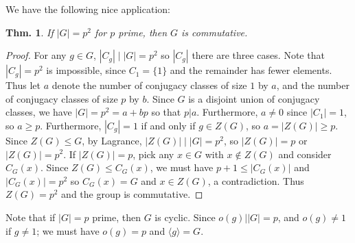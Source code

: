 \documentclass[12pt, a4paper]{book}
\newtheorem{theorem}{Thm.}[section]
\theoremstyle{nonumberplain}
\newtheorem{proof}{Proof}
\begin{document}
We have the following nice application:
\begin{theorem}
    If $|G|=p^2$ for $p$ prime, then $G$ is commutative.
\end{theorem}
\begin{proof}
    For any $g\in G$, $|C_g|\mid|G|=p^2$ so $|C_g|$ there are three cases.
    Note that $|C_g|=p^2$ is impossible, since $C_1=\{1\}$ and the remainder has fewer elements.
    Thus let $a$ denote the number of conjugacy classes of size $1$ by $a$, and the number of conjugacy classes of size $p$ by $b$.
    Since $G$ is a disjoint union of conjugacy classes, we have $|G|=p^2=a+bp$ so that $p|a$.
    Furthermore, $a\neq 0$ since $|C_1|=1$, so $a\geq p$.
    Furthermore, $|C_g|=1$ if and only if $g\in Z(G)$, so $a=|Z(G)|\geq p$.
    Since $Z(G)\leq G$, by Lagrance, $|Z(G)|\mid|G|=p^2$, so $|Z(G)|=p$ or $|Z(G)|=p^2$.
    If $|Z(G)|=p$, pick any $x\in G$ with $x\notin Z(G)$ and consider $C_G(x)$.
    Since $Z(G)\leq C_G(x)$, we must have $p+1\leq |C_G(x)|$ and $|C_G(x)|=p^2$ so $C_G(x)=G$ and $x\in Z(G)$, a contradiction.
    Thus $Z(G)=p^2$ and the group is commutative.
\end{proof}
Note that if $|G|=p$ prime, then $G$ is cyclic.
Since $o(g)||G|=p$, and $o(g)\neq 1$ if $g\neq 1$; we must have $o(g)=p$ and $\langle g\rangle=G$.
\end{document}
